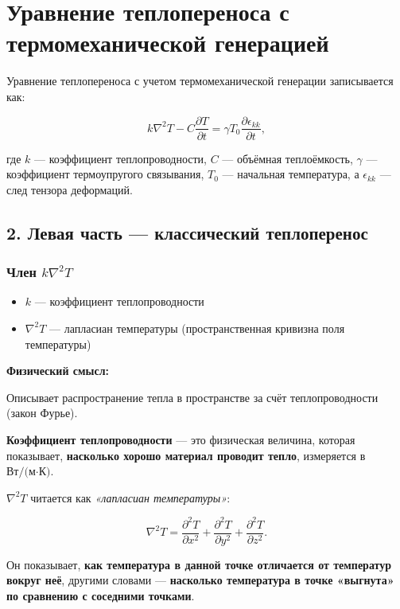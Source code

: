 \section{Уравнение теплопереноса с термомеханической генерацией}

Уравнение теплопереноса с учетом термомеханической генерации записывается как:

\begin{equation}
k \nabla^2 T - C \frac{\partial T}{\partial t} = \gamma T_0 \frac{\partial \epsilon_{kk}}{\partial t},
\label{eq:heat}
\end{equation}

где \(k\) — коэффициент теплопроводности, \(C\) — объёмная теплоёмкость, \(\gamma\) — коэффициент термоупругого связывания, \(T_0\) — начальная температура, а \(\epsilon_{kk}\) — след тензора деформаций.

\subsection{2. Левая часть — классический теплоперенос}

\subsubsection{Член \( k \nabla^2 T \)}

\begin{itemize}
    \item \(k\) — коэффициент теплопроводности
    \item \(\nabla^2 T\) — лапласиан температуры (пространственная кривизна поля температуры)
\end{itemize}

\textbf{Физический смысл:}  

Описывает распространение тепла в пространстве за счёт теплопроводности (закон Фурье).

\textbf{Коэффициент теплопроводности} — это физическая величина, которая показывает, \textbf{насколько хорошо материал проводит тепло}, измеряется в \(\text{Вт/(м·К)}\).

\(\nabla^2 T\) читается как \textit{«лапласиан температуры»}:

\[
\nabla^2 T = \frac{\partial^2 T}{\partial x^2} + \frac{\partial^2 T}{\partial y^2} + \frac{\partial^2 T}{\partial z^2}.
\]

Он показывает, \textbf{как температура в данной точке отличается от температур вокруг неё}, другими словами — \textbf{насколько температура в точке «выгнута» по сравнению с соседними точками}.

